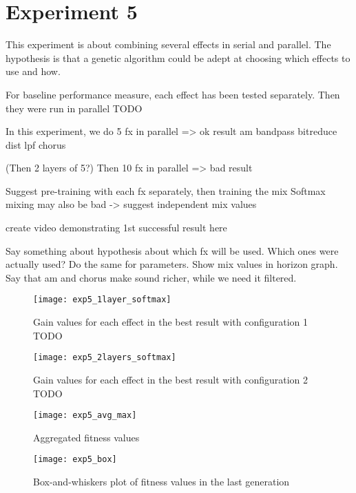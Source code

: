 \section{Experiment 5}
This experiment is about combining several effects in serial and parallel. The hypothesis is that a genetic algorithm could be adept at choosing which effects to use and how.

For baseline performance measure, each effect has been tested separately. Then they were run in parallel TODO



In this experiment, we do 5 fx in parallel => ok result
am
bandpass
bitreduce
dist lpf
chorus

(Then 2 layers of 5?)
Then 10 fx in parallel => bad result

Suggest pre-training with each fx separately, then training the mix
Softmax mixing may also be bad -> suggest independent mix values

create video demonstrating 1st successful result here

Say something about hypothesis about which fx will be used. Which ones were actually used? Do the same for parameters. Show mix values in horizon graph. Say that am and chorus make sound richer, while we need it filtered.

\begin{figure}[h]
    \centering
    \texttt{[image: exp5\_1layer\_softmax]}
    \caption{Gain values for each effect in the best result with configuration 1 TODO}
    \label{fig:exp5_1layer_softmax}
\end{figure}

\begin{figure}[h]
    \centering
    \texttt{[image: exp5\_2layers\_softmax]}
    \caption{Gain values for each effect in the best result with configuration 2 TODO}
    \label{fig:exp5_2layers_softmax}
\end{figure}

\begin{figure}[h]
    \centering
    \texttt{[image: exp5\_avg\_max]}
    \caption{Aggregated fitness values}
    \label{fig:exp5_avg_max}
\end{figure}

\begin{figure}[h]
    \centering
    \texttt{[image: exp5\_box]}
    \caption{Box-and-whiskers plot of fitness values in the last generation}
    \label{fig:exp5_box}
\end{figure}
